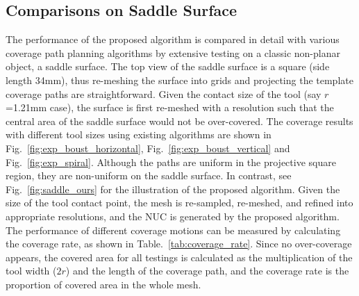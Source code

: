 \documentclass[lettersize,journal]{IEEEtran}
\begin{document}
\subsection{Comparisons on Saddle Surface}\label{section_exp_saddle}
The performance of the proposed algorithm is compared in detail with various coverage path planning algorithms by extensive testing on a classic non-planar object, a saddle surface. 
The top view of the saddle surface is a square (side length 34mm), thus re-meshing the surface into grids and projecting the template coverage paths are straightforward.
Given the contact size of the tool (say $r$=1.21mm case), the surface is first re-meshed with a resolution such that the central area of the saddle surface would not be over-covered.  
The coverage results with different tool sizes using existing algorithms are shown in Fig.~\ref{fig:exp_boust_horizontal}, Fig.~\ref{fig:exp_boust_vertical} and Fig.~\ref{fig:exp_spiral}. 
Although the paths are uniform in the projective square region, they are non-uniform on the saddle surface. 
In contrast, see Fig.~\ref{fig:saddle_ours} for the illustration of the proposed algorithm. 
Given the size of the tool contact point, the mesh is re-sampled, re-meshed, and refined into appropriate resolutions, and the NUC is generated by the proposed algorithm. 
The performance of different coverage motions can be measured by calculating the coverage rate, as shown in Table.~\ref{tab:coverage_rate}. 
Since no over-coverage appears, the covered area for all testings is calculated as the multiplication of the tool width ($2r$) and the length of the coverage path, and the coverage rate is the proportion of covered area in the whole mesh. 
\end{document}
